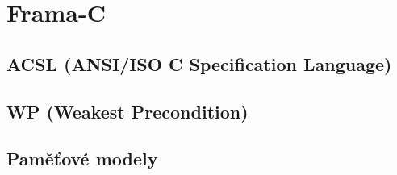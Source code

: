 \chapter{Frama-C}

\section{ACSL (ANSI/ISO C Specification Language)}
\section{WP (Weakest Precondition)}
\section{Paměťové modely}
